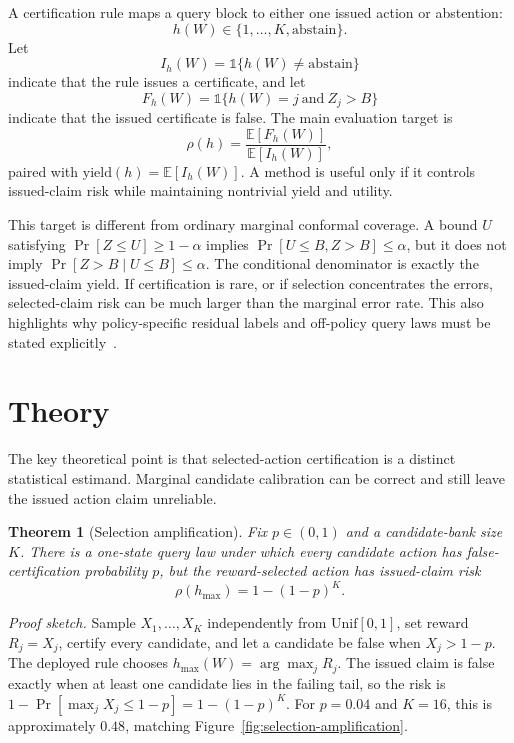 \documentclass[letterpaper]{article}
\newtheorem{theorem}{Theorem}
\begin{document}
A certification rule maps a query block to either one issued action or
abstention:
\[
h(W) \in \{1,\ldots,K,\mathrm{abstain}\}.
\]
Let
\[
I_h(W)=\mathbb{1}\{h(W)\neq \mathrm{abstain}\}
\]
indicate that the rule issues a certificate, and let
\[
F_h(W)=\mathbb{1}\{h(W)=j \ \mathrm{and}\ Z_j>B\}
\]
indicate that the issued certificate is false. The main evaluation target is
\[
\rho(h)=\frac{\mathbb{E}[F_h(W)]}{\mathbb{E}[I_h(W)]},
\]
paired with $\mathrm{yield}(h)=\mathbb{E}[I_h(W)]$. A method is useful only if
it controls issued-claim risk while maintaining nontrivial yield and utility.

This target is different from ordinary marginal conformal coverage. A bound
$U$ satisfying $\Pr[Z \le U]\ge 1-\alpha$ implies
$\Pr[U\le B, Z>B]\le \alpha$, but it does not imply
$\Pr[Z>B \mid U\le B]\le \alpha$. The conditional denominator is exactly the
issued-claim yield. If certification is rare, or if selection concentrates the
errors, selected-claim risk can be much larger than the marginal error rate.
This also highlights why policy-specific residual labels and off-policy query
laws must be stated explicitly~\cite{barber2020limits,foffano2023conformalOPE}.

\section{Theory}

The key theoretical point is that selected-action certification is a distinct
statistical estimand. Marginal candidate calibration can be correct and still
leave the issued action claim unreliable.

\begin{theorem}[Selection amplification]
Fix $p\in(0,1)$ and a candidate-bank size $K$. There is a one-state query law
under which every candidate action has false-certification probability $p$,
but the reward-selected action has issued-claim risk
\[
\rho(h_{\max})=1-(1-p)^K .
\]
\end{theorem}

\noindent\textit{Proof sketch.}
Sample $X_1,\ldots,X_K$ independently from $\mathrm{Unif}[0,1]$, set reward
$R_j=X_j$, certify every candidate, and let a candidate be false when
$X_j>1-p$. The deployed rule chooses $h_{\max}(W)=\arg\max_j R_j$. The issued
claim is false exactly when at least one candidate lies in the failing tail, so
the risk is $1-\Pr[\max_j X_j\le 1-p]=1-(1-p)^K$. For $p=0.04$ and $K=16$, this
is approximately $0.48$, matching Figure~\ref{fig:selection-amplification}.
\end{document}
